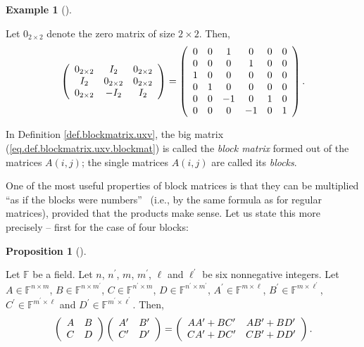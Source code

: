 \documentclass[numbers=enddot,12pt,final,onecolumn,notitlepage]{scrartcl}%
\numberwithin{exer}{subsection}
\theoremstyle{definition}
\newtheorem{prop}[theo]{Proposition}
\newenvironment{proposition}[1][]
{\begin{prop}[#1]\begin{leftbar}}
{\end{leftbar}\end{prop}}
\newtheorem{exam}[theo]{Example}
\newenvironment{example}[1][]
{\begin{exam}[#1]\begin{leftbar}}
{\end{leftbar}\end{exam}}
\begin{document}
\begin{example}
Let $0_{2\times2}$ denote the zero matrix of size $2\times2$. Then,%
\[
\left(
\begin{array}
[c]{ccc}%
0_{2\times2} & I_{2} & 0_{2\times2}\\
I_{2} & 0_{2\times2} & 0_{2\times2}\\
0_{2\times2} & -I_{2} & I_{2}%
\end{array}
\right)  =\left(
\begin{array}
[c]{cccccc}%
0 & 0 & 1 & 0 & 0 & 0\\
0 & 0 & 0 & 1 & 0 & 0\\
1 & 0 & 0 & 0 & 0 & 0\\
0 & 1 & 0 & 0 & 0 & 0\\
0 & 0 & -1 & 0 & 1 & 0\\
0 & 0 & 0 & -1 & 0 & 1
\end{array}
\right)  .
\]

\end{example}

In Definition \ref{def.blockmatrix.uxv}, the big matrix
(\ref{eq.def.blockmatrix.uxv.blockmat}) is called the \emph{block matrix}
formed out of the matrices $A\left(  i,j\right)  $; the single matrices
$A\left(  i,j\right)  $ are called its \emph{blocks}.

One of the most useful properties of block matrices is that they can be
multiplied \textquotedblleft as if the blocks were numbers\textquotedblright%
\ (i.e., by the same formula as for regular matrices), provided that the
products make sense. Let us state this more precisely -- first for the case of
four blocks:

\begin{proposition}
\label{prop.blockmatrix.mult-2x2}Let $\mathbb{F}$ be a field. Let $n$,
$n^{\prime}$, $m$, $m^{\prime}$, $\ell$ and $\ell^{\prime}$ be six nonnegative
integers. Let $A\in\mathbb{F}^{n\times m}$, $B\in\mathbb{F}^{n\times
m^{\prime}}$, $C\in\mathbb{F}^{n^{\prime}\times m}$, $D\in\mathbb{F}%
^{n^{\prime}\times m^{\prime}}$, $A^{\prime}\in\mathbb{F}^{m\times\ell}$,
$B^{\prime}\in\mathbb{F}^{m\times\ell^{\prime}}$, $C^{\prime}\in
\mathbb{F}^{m^{\prime}\times\ell}$ and $D^{\prime}\in\mathbb{F}^{m^{\prime
}\times\ell^{\prime}}$. Then,
\[
\left(
\begin{array}
[c]{cc}%
A & B\\
C & D
\end{array}
\right)  \left(
\begin{array}
[c]{cc}%
A^{\prime} & B^{\prime}\\
C^{\prime} & D^{\prime}%
\end{array}
\right)  =\left(
\begin{array}
[c]{cc}%
AA^{\prime}+BC^{\prime} & AB^{\prime}+BD^{\prime}\\
CA^{\prime}+DC^{\prime} & CB^{\prime}+DD^{\prime}%
\end{array}
\right)  .
\]

\end{proposition}
\end{document}
